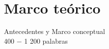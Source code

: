 \section{Marco teórico}
\label{Marco teórico}
Antecedentes y Marco conceptual\\
400 − 1 200 palabras\\
\lipsum